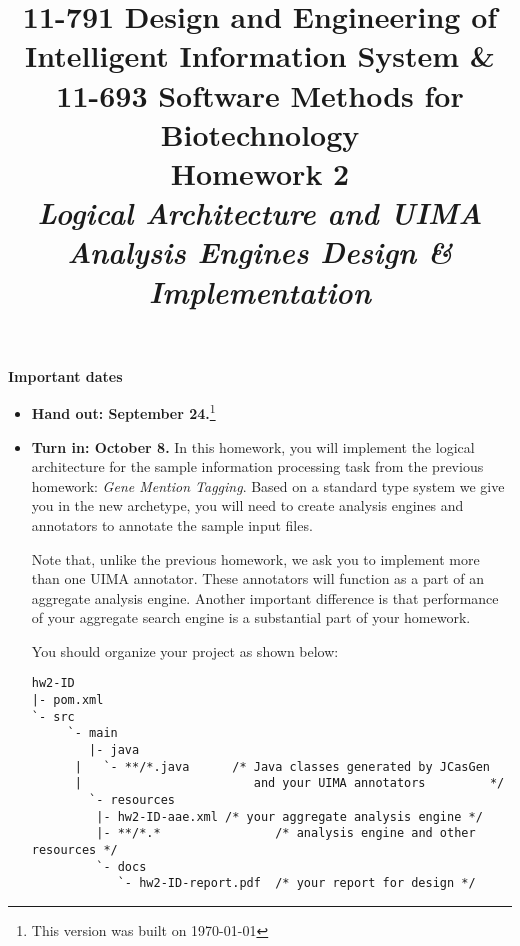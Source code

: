 \documentclass[oneside]{memoir}
\title{{\bfseries 11-791 Design and Engineering of Intelligent Information
System \& \\11-693 Software Methods for Biotechnology \\Homework 2}\\
\vspace{1em}
\itshape\rmfamily Logical Architecture and UIMA Analysis Engines Design \&
Implementation}
\date{}
\begin{document}
\begin{titlingpage}
\maketitle

\hspace{-0.1\textwidth}
\begin{minipage}{1.2\textwidth}
\vspace{-5em}
\textbf{Important dates}
\begin{itemize}

\item \textbf{Hand out: September 24.}\footnote{This version was built on \today}

\item \textbf{Turn in: October 8.} In this homework, you will implement the
logical architecture for the sample information processing task from the previous homework:
\emph{Gene Mention Tagging}. Based on a standard type system we give you in
the new archetype, you will need to create analysis engines and annotators to
annotate the sample input files. 

Note that, unlike the previous homework, we ask you to implement more than one UIMA annotator.
These annotators will function as a part of an aggregate analysis engine.
Another important difference is that performance of your aggregate search engine
is a substantial part of your homework.

You should organize your project as shown below:

\small
\begin{verbatim}
hw2-ID
|- pom.xml
`- src
     `- main
        |- java
      |   `- **/*.java      /* Java classes generated by JCasGen
      |                        and your UIMA annotators         */ 
        `- resources
         |- hw2-ID-aae.xml /* your aggregate analysis engine */
         |- **/*.*                /* analysis engine and other resources */
         `- docs
            `- hw2-ID-report.pdf  /* your report for design */

\end{verbatim}
\normalsize

\end{itemize}

\end{minipage}
\hspace{-0.1\textwidth}

\hspace{-0.1\textwidth}
\begin{minipage}{1.2\textwidth}


\end{minipage}
\end{titlingpage}
\end{document}
